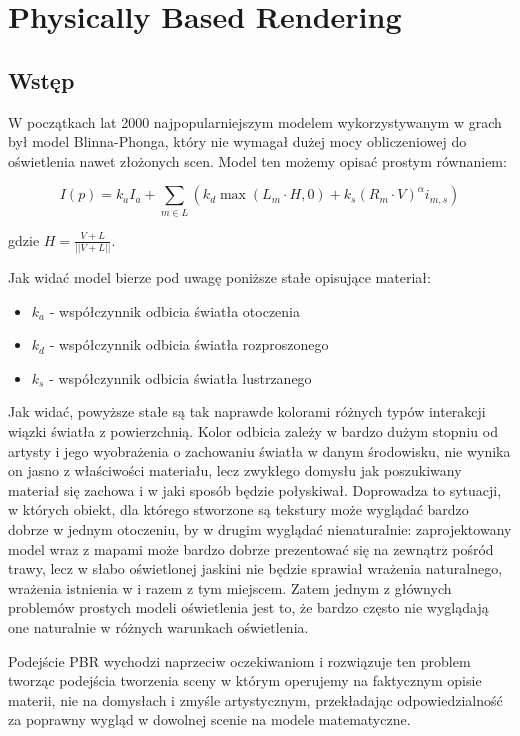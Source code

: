 \documentclass[../main.tex]{subfiles}
\begin{document}
\chapter{Physically Based Rendering}

\section{Wstęp}

W początkach lat 2000 najpopularniejszym modelem wykorzystywanym w grach był
model Blinna-Phonga, który nie wymagał dużej mocy obliczeniowej do oświetlenia
nawet złożonych scen. Model ten możemy opisać prostym równaniem:

\[
	I(p) = k_a I_a +
		\sum_{m \in L} \left( {
			k_d \max\left({ L_m \cdot H, 0 }\right) +
			k_s (R_m \cdot V)^{\alpha} i_{m,s}
	} \right)
\]

gdzie $ H = \frac{V+L}{||V+L||} $.

Jak widać model bierze pod uwagę poniższe stałe opisujące materiał:

\begin{itemize}
\item $k_a$ - współczynnik odbicia światła otoczenia
\item $k_d$ - współczynnik odbicia światła rozproszonego
\item $k_s$ - współczynnik odbicia światła lustrzanego
\end{itemize}

Jak widać, powyższe stałe są tak naprawde kolorami różnych typów interakcji
wiązki światła z powierzchnią. Kolor odbicia zależy w bardzo dużym stopniu od
artysty i jego wyobrażenia o zachowaniu światła w danym środowisku, nie wynika
on jasno z właściwości materiału, lecz zwykłego domysłu jak poszukiwany
materiał się zachowa i w jaki sposób będzie połyskiwał. Doprowadza to sytuacji,
w których obiekt, dla którego stworzone są tekstury może wyglądać bardzo dobrze
w jednym otoczeniu, by w drugim wyglądać nienaturalnie: zaprojektowany model
wraz z mapami może bardzo dobrze prezentować się na zewnątrz pośród trawy, lecz
w słabo oświetlonej jaskini nie będzie sprawiał wrażenia naturalnego, wrażenia
istnienia w i razem z tym miejscem. Zatem jednym z głównych problemów prostych
modeli oświetlenia jest to, że bardzo często nie wyglądają one naturalnie w
różnych warunkach oświetlenia.

Podejście PBR wychodzi naprzeciw oczekiwaniom i rozwiązuje ten problem tworząc
podejścia tworzenia sceny w którym operujemy na faktycznym opisie materii, nie
na domysłach i zmyśle artystycznym, przekładając odpowiedzialność za poprawny
wygląd w dowolnej scenie na modele matematyczne.
\end{document}
